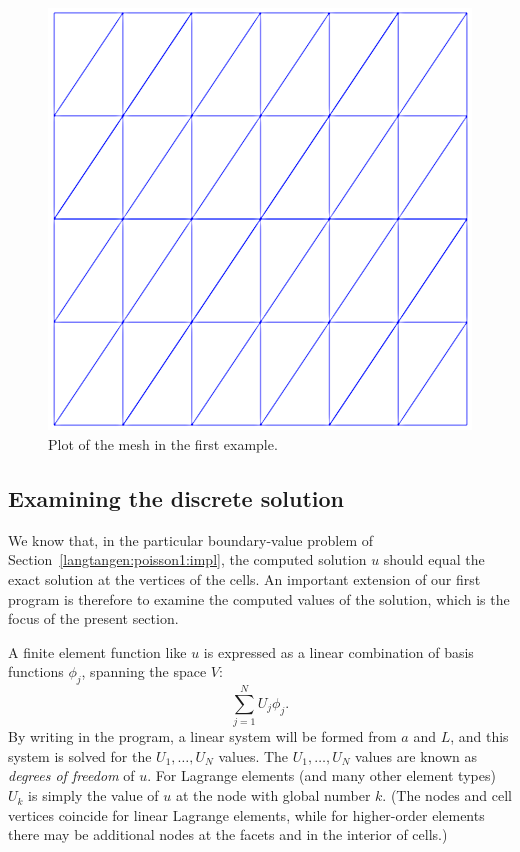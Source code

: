 \begin{figure}
  \centering
  \includegraphics[width=\smallfig]{chapters/langtangen/png/ex1_mesh.png}
  \caption{Plot of the mesh in the first \fenics{} example.}
  \label{tut:poisson:2D:fig:ex1:mesh}
\end{figure}

\subsection{Examining the discrete solution}
\label{langtangen:poisson1:verify1}

We know that, in the particular boundary-value problem of
Section~\ref{langtangen:poisson1:impl}, the computed solution $u$ should
equal the exact solution at the vertices of the cells.  An important
extension of our first program is therefore to examine the computed
values of the solution, which is the focus of the present section.

A finite element function like $u$ is expressed as a linear combination
of basis functions $\phi_j$, spanning the space $V$:
\begin{equation}
  \sum_{j=1}^N U_j \phi_j.
\label{langtangen:poisson1:ufem}
\end{equation}
By writing  in the program, a linear system
will be formed from $a$ and $L$, and this system is solved for
the $U_1,\ldots,U_N$ values. The $U_1,\ldots,U_N$ values are known
 as \emph{degrees of freedom} of $u$. For
Lagrange elements (and many other element types) $U_k$ is simply the value
of $u$ at the node with global number $k$.  (The nodes and cell vertices
coincide for linear Lagrange elements, while for higher-order elements
there may be additional nodes at the facets and in the interior of cells.)

